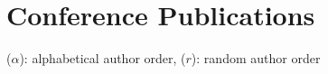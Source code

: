 \documentclass{article}
\begin{document}
    \section{Conference Publications}
    {\footnotesize($\alpha$): alphabetical author order, ($r$): random author order}
    
    \begin{etaremune}
    	[itemsep=0.2ex,
    	leftmargin=4.8ex]
    	\renewcommand{\labelenumi}{C\theenumi.}
        
    \end{etaremune}

    
    
%        
%    
%   
    
    
    
    
    
\end{document}
